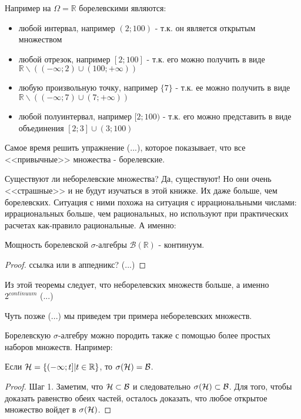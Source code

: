 {\begin{myex} Например на $ \Omega=\mathbb{R} $ борелевскими являются:
\begin{itemize}
\item любой интервал, например $(2;100)$ - т.к. он является открытым множеством
\item любой отрезок, например $[2;100]$ - т.к. его можно получить в виде $\mathbb{R}\backslash((-\infty;2)\cup (100;+\infty))$ 
\item любую произвольную точку, например $\{7\}$ - т.к. ее можно получить в виде $\mathbb{R}\backslash ((-\infty;7)\cup (7;+\infty))$ 
\item любой полуинтервал, например $[2;100)$ - т.к. его можно представить в виде объединения $[2;3] \cup (3;100)$
\end{itemize}
\end{myex}

Самое время решить упражнение (...), которое показывает, что все <<привычные>> множества - борелевские.

Существуют ли неборелевские множества? Да, существуют! Но они очень <<страшные>> и не будут изучаться в этой книжке. Их даже больше, чем борелевских. Ситуация с ними похожа на ситуация с иррациональными числами: иррациональных больше, чем рациональных, но используют при практических расчетах как-правило рациональные. А именно:

\begin{myth} Мощность борелевской $\sigma$-алгебры $\mathcal{B}(\mathbb{R})$ - континуум.
\end{myth}
\begin{proof} ссылка или в аппедникс? (...)
\end{proof}
Из этой теоремы следует, что неборелевских множеств больше, а именно $2^{continuum}$ (...)


Чуть позже (...) мы приведем три примера неборелевских множеств.


Борелевскую $\sigma$-алгебру можно породить также с помощью более простых наборов множеств. Например:

\begin{myth} \label{generate_borel}

Если $\mathcal{H}=\{(-\infty;t]|t\in\mathbb{R}\}$, то $\sigma(\mathcal{H})=\mathcal{B}$.
\end{myth}
\begin{proof} Шаг 1. Заметим, что $\mathcal{H}\subset\mathcal{B}$ и следовательно $\sigma(\mathcal{H})\subset\mathcal{B}$. Для того, чтобы доказать равенство обеих частей, осталось доказать, что любое открытое множество войдет в $\sigma(\mathcal{H})$.


\end{proof}}
